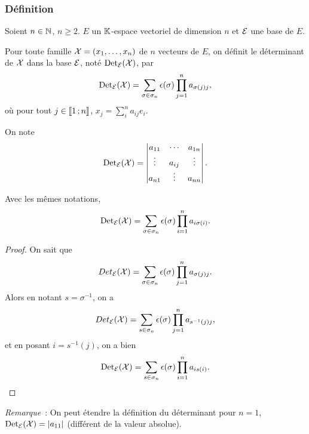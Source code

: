 \subsubsection{Définition}

Soient \(n \in \mathbb{N}\), \(n\geqslant 2\). \(E\) un \(\mathbb{K}\)-espace vectoriel de
dimension \(n\) et \(\mathcal{E}\) une base de \(E\).
\begin{defdef}
  Pour toute famille \(\mathcal{X}=(x_1, \ldots, x_n)\) de \(n\) vecteurs de \(E\), on
  définit le déterminant de \(\mathcal{X}\) dans la base \(\mathcal{E}\), noté \(\operatorname{Det}_{\mathcal{E}}(\mathcal{X})\),
  par
  \begin{equation}
    \operatorname{Det}_{\mathcal{E}}(\mathcal{X}) = \sum_{\sigma \in \sigma_n}\epsilon(\sigma) \prod_{j=1}^n
    a_{\sigma(j)j},
  \end{equation}
  où pour tout \(j \in \mathopen{\llbracket}1\mathclose{}\mathpunct{};n\mathclose{\rrbracket}\), \(x_j=\sum_{i}^n a_{ij}e_i\).
\end{defdef}
On note \begin{equation}
  \operatorname{Det}_{\mathcal{E}}(\mathcal{X}) = \begin{vmatrix} a_{11} & \cdots & a_{1n} \\ \vdots & a_{ij} &
  \vdots \\ a_{n1} & \vdots & a_{nn}\end{vmatrix}.
\end{equation}
%
\begin{prop}
  Avec les mêmes notations,
  \begin{equation}
    \operatorname{Det}_{\mathcal{E}}(\mathcal{X}) = \sum_{\sigma \in \sigma_n}\epsilon(\sigma) \prod_{i=1}^n
    a_{i\sigma(i)}.
  \end{equation}
\end{prop}
\begin{proof}
  On sait que
  \begin{equation}
    Det_{\mathcal{E}}(\mathcal{X}) = \sum_{\sigma \in \sigma_n}\epsilon(\sigma) \prod_{j=1}^n
    a_{\sigma(j)j}.
  \end{equation}
  Alors en notant \(s=\sigma^{-1}\), on a
  \begin{equation}
    Det_{\mathcal{E}}(\mathcal{X}) = \sum_{s \in \sigma_n}\epsilon(\sigma) \prod_{j=1}^n
    a_{s^{-1}(j)j},
  \end{equation}
  et en posant \(i=s^{-1}(j)\), on a bien
  \begin{equation}
    \operatorname{Det}_{\mathcal{E}}(\mathcal{X}) = \sum_{s \in \sigma_n}\epsilon(\sigma) \prod_{i=1}^n a_{is(i)}.
  \end{equation}
\end{proof}

\emph{Remarque}~: On peut étendre la définition du déterminant pour \(n=1\),
\(\operatorname{Det}_{\mathcal{E}}(\mathcal{X}) = \left\lvert a_{11}\right\rvert\) (\danger différent de la valeur absolue).

